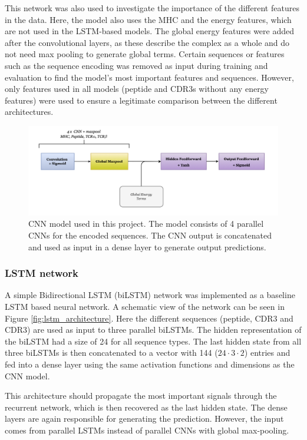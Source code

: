 This network was also used to investigate the importance of the different features in the data. Here, the model also uses the MHC and the energy features, which are not used in the LSTM-based models. The global energy features were added after the convolutional layers, as these describe the complex as a whole and do not need max pooling to generate global terms. Certain sequences or features such as the sequence encoding was removed as input during training and evaluation to find the model's most important features and sequences. However, only features used in all models (peptide and CDR3s without any energy features) were used to ensure a legitimate comparison between the different architectures.
\begin{figure}[H]
    \centering
    \includegraphics[width=\linewidth]{figures/cnn_architecture.png}
    \caption{CNN model used in this project. The model consists of 4 parallel CNNs for the encoded sequences. The CNN output is concatenated and used as input in a dense layer to generate output predictions.}
    \label{fig:cnn_architecture}
\end{figure}

\subsubsection{LSTM network}
A simple Bidirectional LSTM (biLSTM) network was implemented as a baseline LSTM based neural network. A schematic view of the network can be seen in Figure \ref{fig:lstm_architecture}. Here the different sequences (peptide, CDR3{\textalpha} and CDR3{\textbeta}) are used as input to three parallel biLSTMs. The hidden representation of the biLSTM had a size of 24 for all sequence types. The last hidden state from all three biLSTMs is then concatenated to a vector with 144 ($24 \cdot 3 \cdot 2$) entries and fed into a dense layer using the same activation functions and dimensions as the CNN model.

This architecture should propagate the most important signals through the recurrent network, which is then recovered as the last hidden state. The dense layers are again responsible for generating the prediction. However, the input comes from parallel LSTMs instead of parallel CNNs with global max-pooling.

